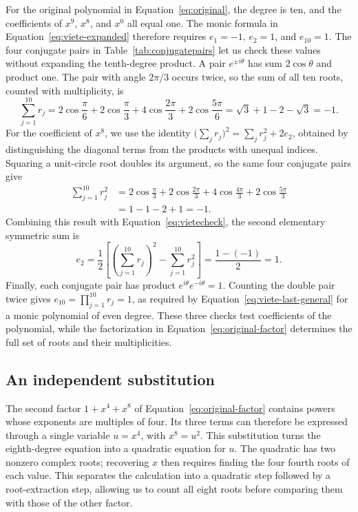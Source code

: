 \documentclass[11pt,a4paper]{article}
\numberwithin{equation}{section}
\theoremstyle{uprightpaper}
\begin{document}
For the original polynomial in Equation~\eqref{eq:original}, the degree is ten, and the coefficients of $x^9$, $x^8$, and $x^0$ all equal one. The monic formula in Equation~\eqref{eq:viete-expanded} therefore requires $e_1=-1$, $e_2=1$, and $e_{10}=1$. The four conjugate pairs in Table~\ref{tab:conjugatepairs} let us check these values without expanding the tenth-degree product. A pair $e^{\pm i\theta}$ has sum $2\cos\theta$ and product one. The pair with angle $2\pi/3$ occurs twice, so the sum of all ten roots, counted with multiplicity, is
\begin{equation}\label{eq:vietecheck}
 \sum_{j=1}^{10}r_j
 =2\cos\frac{\pi}{6}+2\cos\frac{\pi}{3}
  +4\cos\frac{2\pi}{3}+2\cos\frac{5\pi}{6}
 =\sqrt3+1-2-\sqrt3=-1.
\end{equation}
For the coefficient of $x^8$, we use the identity $\bigl(\sum_jr_j\bigr)^2=\sum_jr_j^2+2e_2$, obtained by distinguishing the diagonal terms from the products with unequal indices. Squaring a unit-circle root doubles its argument, so the same four conjugate pairs give
\begin{equation}\label{eq:viete-power-sum}
 \begin{aligned}
 \sum_{j=1}^{10}r_j^2
 &=2\cos\frac{\pi}{3}+2\cos\frac{2\pi}{3}
   +4\cos\frac{4\pi}{3}+2\cos\frac{5\pi}{3}\\
 &=1-1-2+1=-1.
 \end{aligned}
\end{equation}
Combining this result with Equation~\eqref{eq:vietecheck}, the second elementary symmetric sum is
\begin{equation}\label{eq:viete-second-sum}
 e_2=\frac12\left[\left(\sum_{j=1}^{10}r_j\right)^2
                   -\sum_{j=1}^{10}r_j^2\right]
 =\frac{1-(-1)}{2}=1.
\end{equation}
Finally, each conjugate pair has product $e^{i\theta}e^{-i\theta}=1$. Counting the double pair twice gives $e_{10}=\prod_{j=1}^{10}r_j=1$, as required by Equation~\eqref{eq:viete-last-general} for a monic polynomial of even degree. These three checks test coefficients of the polynomial, while the factorization in Equation~\eqref{eq:original-factor} determines the full set of roots and their multiplicities.

\subsection{An independent substitution}\label{subsec:substitution}

The second factor $1+x^4+x^8$ of Equation~\eqref{eq:original-factor} contains powers whose exponents are multiples of four. Its three terms can therefore be expressed through a single variable $u=x^4$, with $x^8=u^2$. This substitution turns the eighth-degree equation into a quadratic equation for $u$. The quadratic has two nonzero complex roots; recovering $x$ then requires finding the four fourth roots of each value. This separates the calculation into a quadratic step followed by a root-extraction step, allowing us to count all eight roots before comparing them with those of the other factor.
\end{document}
